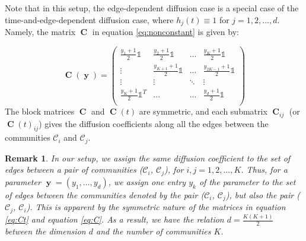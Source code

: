 \documentclass[12pt, oneside]{report}   	%
\newtheorem{rmk}{Remark}
\DeclareMathOperator{\CC}{\boldsymbol{C}}
\DeclareMathOperator{\y}{\boldsymbol{y}}
\begin{document}
Note that in this setup, the edge-dependent diffusion case is a special case of the time-and-edge-dependent diffusion case, where $h_j(t)\equiv 1$ for $j=1,2,...,d$. Namely, the matrix $\CC$ in equation \eqref{eq:nonconstant} is given by:

\begin{equation}
\label{eq:C}
\CC(\y) = \begin{pmatrix}
\frac{y_1+1}{2}\mathds{1} & \frac{y_2+1}{2}\mathds{1} & ... & \frac{y_K+1}{2}\mathds{1} \\
\vdots & \frac{y_{K+1}+1}{2}\mathds{1} & ... & \frac{y_{2K-1}+1}{2}\mathds{1} \\
\vdots & \vdots & \ddots & \vdots \\
\frac{y_K+1}{2}\mathds{1}^T & ... & ... & \frac{y_d+1}{2}\mathds{1} \\
\end{pmatrix}
\end{equation}
The block matrices $\CC$ and $\CC(t)$ are symmetric, and each submatrix $\CC_{ij}$ (or $\CC(t)_{ij}$) gives the diffusion coefficients along all the edges between the communities $\mathcal{C}_i$ and $\mathcal{C}_j$.
\begin{rmk}
\label{rmk:dimvscom}
In our setup, we assign the same diffusion coefficient to the set of edges between a pair of communities ($\mathcal{C}_i$, $\mathcal{C}_j$), for $i,j=1,2,...,K$. Thus, for a parameter $\y=(y_1,...,y_d)$, we assign one entry $y_k$ of the parameter to the set of edges between the communities denoted by the pair  ($\mathcal{C}_i$, $\mathcal{C}_j$), but also the pair ($\mathcal{C}_j$, $\mathcal{C}_i$). This is apparent by the symmetric nature of the matrices in equation \eqref{eq:Ct} and equation \eqref{eq:C}. As a result, we have the relation $d=\frac{K(K+1)}{2}$ between the dimension $d$ and the number of communities $K$.
\end{rmk}
\smallskip
\end{document}
